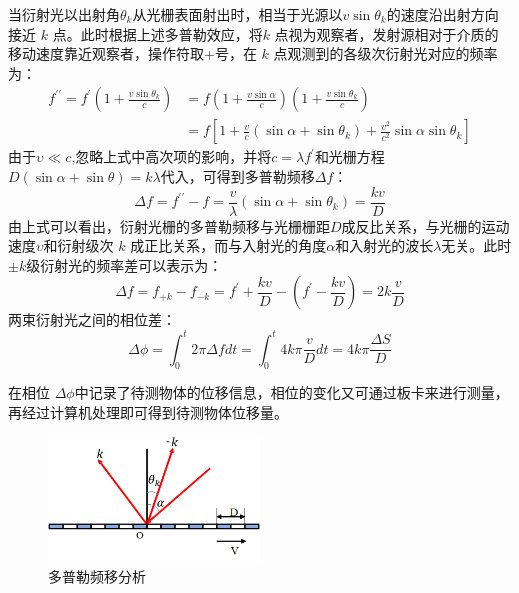 \documentclass[type=master,oneside]{fduthesis}
\begin{document}
当衍射光以出射角$ \theta_{k} $从光栅表面射出时，相当于光源以$ v \sin \theta_{k} $的速度沿出射方向接近 $ k $ 点。此时根据上述多普勒效应，将$ k $ 点视为观察者，发射源相对于介质的移动速度靠近观察者，操作符取+号，在 $ k $ 点观测到的各级次衍射光对应的频率为：
\begin{equation}
  \begin{aligned}
    f^{\prime \prime}=f^{\prime}\left(1+\frac{v \sin \theta_{k}}{c}\right) & =f\left(1+\frac{v \sin \alpha}{c}\right)\left(1+\frac{v \sin \theta_{k}}{c}\right) \\& =f\left[1+\frac{v}{c}\left(\sin \alpha+\sin \theta_{k}\right)+\frac{v^{2}}{c^{2}} \sin \alpha \sin \theta_{k}\right]
  \end{aligned}
\end{equation}
由于$ \upsilon \ll c$,忽略上式中高次项的影响，并将$c=\lambda f^{\prime}$和光栅方程$D(\sin \alpha+\sin \theta)=k \lambda$代入，可得到多普勒频移$ \Delta f $：
\begin{equation}
  \Delta f=f^{\prime \prime}-f=\frac{v}{\lambda}\left(\sin \alpha+\sin \theta_{k}\right)=\frac{k v}{D}
\end{equation}
由上式可以看出，衍射光栅的多普勒频移与光栅栅距$D$成反比关系，与光栅的运动速度$ \upsilon $和衍射级次 $ k $ 成正比关系，而与入射光的角度$ \alpha $和入射光的波长$\lambda $无关。此时 $ \pm k $级衍射光的频率差可以表示为：
\begin{equation}
  \Delta f=f_{+k}-f_{-k}=f^{\prime}+\frac{k v}{D}-\left(f^{\prime}-\frac{k v}{D}\right)=2 k \frac{v}{D}
\end{equation}
两束衍射光之间的相位差：
\begin{equation}
  \Delta \phi=\int_{0}^{t} 2 \pi \Delta f d t=\int_{0}^{t} 4 k \pi \frac{v}{D} d t=4 k \pi \frac{\Delta S}{D}
\end{equation}

在相位 $ \Delta \phi $中记录了待测物体的位移信息，相位的变化又可通过板卡来进行测量，再经过计算机处理即可得到待测物体位移量。

\begin{figure}[H]
  \centering
  \includegraphics[width=0.5\textwidth]{2-fig/多普勒频移分析.png}
  \caption{多普勒频移分析}
  \label{fig:多普勒频移分析}
\end{figure}
\end{document}
